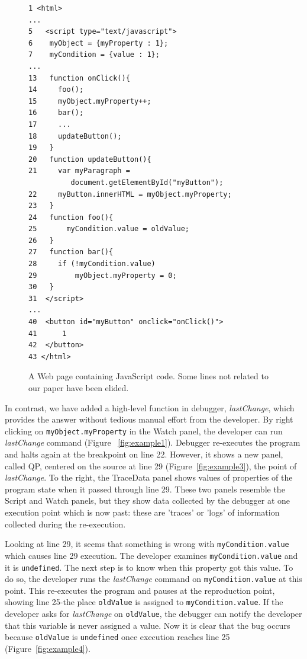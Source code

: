 \documentclass[runningheads,a4paper]{llncs}
\begin{document}
\begin{figure}[htp]
\begin{verbatim}
1 <html>
...
5   <script type="text/javascript">
6    myObject = {myProperty : 1};
7    myCondition = {value : 1};
...
13   function onClick(){
14     foo();
15     myObject.myProperty++;
16     bar();
17     ...
18     updateButton();
19   }
20   function updateButton(){
21     var myParagraph =
          document.getElementById("myButton");
22     myButton.innerHTML = myObject.myProperty;
23   }   
24   function foo(){
25  	 myCondition.value = oldValue;
26   }  
27   function bar(){ 
28     if (!myCondition.value)
29         myObject.myProperty = 0;
30   }
31  </script> 
...
40  <button id="myButton" onclick="onClick()">
41  	1 
42  </button>
43 </html>
\end{verbatim}
\caption{A Web page containing JavaScript code. Some lines not related to our paper have been elided.}
\label{fig:js-code}
\end{figure}


In contrast, we have added a high-level function in debugger,
\textit{lastChange}, which provides the answer without tedious manual
effort from the developer. By right clicking on
\texttt{myObject.myProperty} in the Watch panel, the developer can run
\textit{lastChange} command (Figure ~\ref{fig:example1}). Debugger
re-executes the program and halts again at the breakpoint on line 22.
However, it shows a new panel, called QP, centered on the source at line 29
(Figure~\ref{fig:example3}), the point of \textit{lastChange}.  To
the right, the TraceData panel shows values of properties of the
program state when it passed through line 29.  These two panels
resemble the Script and Watch panels, but they show data collected by
the debugger at one execution point which is now past: these are
'traces' or 'logs' of information collected during the re-execution.

Looking at line 29, it seems that something is wrong with
\texttt{myCondition.value} which causes line 29 execution. The
developer examines \texttt{myCondition.value} and it is
\texttt{undefined}. The next step is to know when this property got
this value. To do so, the developer runs the \textit{lastChange} command
on \texttt{myCondition.value} at this point. This re-executes the
program and pauses at the reproduction point,  showing line 25-the
place \texttt{oldValue} is assigned to
\texttt{myCondition.value}. If the developer asks for \textit{lastChange} on \texttt{oldValue}, 
the debugger can notify the developer that this variable is never assigned a value.
 Now it is clear that the bug occurs because \texttt{oldValue} is
\texttt{undefined} once execution reaches line 25 (Figure~\ref{fig:example4}).
\end{document}
